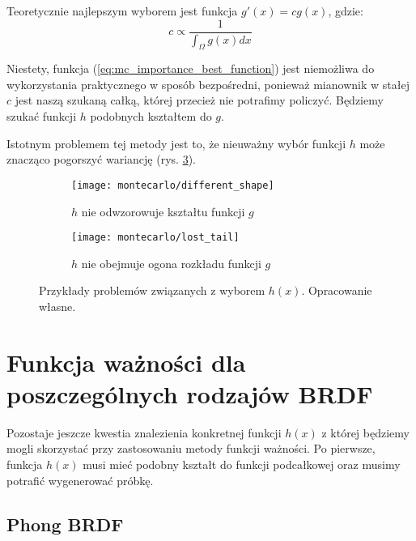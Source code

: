 \documentclass[../main.tex]{subfiles}
\begin{document}
Teoretycznie najlepszym wyborem jest funkcja $g'(x) = cg(x)$, gdzie:
\begin{equation}
    c \propto \frac{1}{\int_{\Omega}{g(x)dx}}
    \label{eq:mc_importance_best_function}
\end{equation}

\noindent Niestety, funkcja (\ref{eq:mc_importance_best_function}) jest niemożliwa do wykorzystania praktycznego w sposób bezpośredni, ponieważ mianownik w stałej $c$ jest naszą szukaną całką, której przecież nie potrafimy policzyć. Będziemy szukać funkcji $h$ podobnych kształtem do $g$.

Istotnym problemem tej metody jest to, że nieuważny wybór funkcji $h$ może znacząco pogorszyć wariancję (rys. \ref{fig:ImportanceSamplingProblems}).

\begin{figure}
  \centering

  \begin{subfigure}[t]{0.45\textwidth}
    \texttt{[image: montecarlo/different\_shape]}
    \label{fig:ImportanceSamplingWrongFunction}
    \caption{$h$ nie odwzorowuje kształtu funkcji $g$}
  \end{subfigure}
  \begin{subfigure}[t]{0.45\textwidth}
    \centering
    \texttt{[image: montecarlo/lost\_tail]}
    \label{fig:ImportanceSamplingLostTail}
    \caption{$h$ nie obejmuje ogona rozkładu funkcji $g$}
  \end{subfigure}

  \caption{Przykłady problemów związanych z wyborem $h(x)$. Opracowanie własne.}
  \label{fig:ImportanceSamplingProblems}
\end{figure}

\section{Funkcja ważności dla poszczególnych rodzajów BRDF}

Pozostaje jeszcze kwestia znalezienia konkretnej funkcji $h(x)$ z której będziemy mogli skorzystać przy zastosowaniu metody funkcji ważności. Po pierwsze, funkcja $h(x)$ musi mieć podobny kształt do funkcji podcałkowej oraz musimy potrafić wygenerować próbkę.

\subsection{Phong BRDF}
\end{document}
